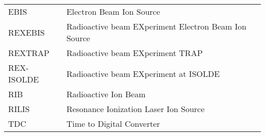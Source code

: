 \begin{tabular}{ll}
    EBIS        &  Electron Beam Ion Source                                   \\
    REXEBIS     &  Radioactive beam EXperiment Electron Beam Ion Source       \\
    REXTRAP     &  Radioactive beam EXperiment TRAP                           \\
    REX-ISOLDE  &  Radioactive beam EXperiment at ISOLDE                      \\
    RIB         &  Radioactive Ion Beam                                       \\
    RILIS       &  Resonance Ionization Laser Ion Source                      \\
    TDC         &  Time to Digital Converter                                  \\
    \hline
\end{tabular}
\label{tab:acro}
